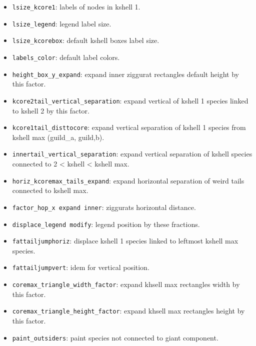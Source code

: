 \documentclass[11pt]{article}
\begin{document}
\begin{itemize}
\item \texttt{lsize\_kcore1}: labels of nodes in kshell 1.

\item \texttt{lsize\_legend}: legend label size.

\item \texttt{lsize\_kcorebox}: default kshell boxes label size.

\item \texttt{labels\_color}: default label colors.

\item \texttt{height\_box\_y\_expand}: expand inner ziggurat rectangles default height by this factor.

\item \texttt{kcore2tail\_vertical\_separation}: expand vertical of kshell 1 species linked to kshell 2 by this factor.

\item \texttt{kcore1tail\_disttocore}: expand vertical separation of kshell 1 species from kshell max (guild\_a, guild,b).

\item \texttt{innertail\_vertical\_separation}: expand vertical separation of kshell species connected to 2 < kshell < kshell max.

\item \texttt{horiz\_kcoremax\_tails\_expand}: expand horizontal separation of weird tails connected to kshell max.

\item \texttt{factor\_hop\_x expand inner}: ziggurats horizontal distance.

\item \texttt{displace\_legend modify}: legend position by these fractions.

\item \texttt{fattailjumphoriz}: displace kshell 1 species linked to leftmost kshell max species.

\item \texttt{fattailjumpvert}: idem for vertical position.

\item \texttt{coremax\_triangle\_width\_factor}: expand khsell max rectangles width by this factor.

\item \texttt{coremax\_triangle\_height\_factor}: expand khsell max rectangles height by this factor.

\item \texttt{paint\_outsiders}: paint species not connected to giant component.


\end{itemize}
\end{document}
